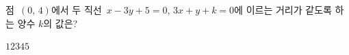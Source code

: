 점~$(0,\,4)$에서 두 직선~$x-3y+5=0$, $3x+y+k=0$에 이르는 거리가 같도록 하는 양수 $k$의 값은?
\begin{choices32}{$1$}{$2$}{$3$}{$4$}{$5$}\end{choices32}
